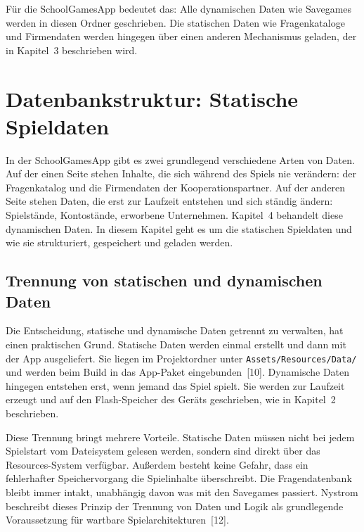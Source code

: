 \documentclass[12pt,a4paper]{article}
\begin{document}
Für die SchoolGamesApp bedeutet das: Alle dynamischen Daten wie Savegames werden in diesen Ordner geschrieben. Die statischen Daten wie Fragenkataloge und Firmendaten werden hingegen über einen anderen Mechanismus geladen, der in Kapitel~3 beschrieben wird.


\section{Datenbankstruktur: Statische Spieldaten}

In der SchoolGamesApp gibt es zwei grundlegend verschiedene Arten von Daten. Auf der einen Seite stehen Inhalte, die sich während des Spiels nie verändern: der Fragenkatalog und die Firmendaten der Kooperationspartner. Auf der anderen Seite stehen Daten, die erst zur Laufzeit entstehen und sich ständig ändern: Spielstände, Kontostände, erworbene Unternehmen. Kapitel~4 behandelt diese dynamischen Daten. In diesem Kapitel geht es um die statischen Spieldaten und wie sie strukturiert, gespeichert und geladen werden.

\subsection{Trennung von statischen und dynamischen Daten}

Die Entscheidung, statische und dynamische Daten getrennt zu verwalten, hat einen praktischen Grund. Statische Daten werden einmal erstellt und dann mit der App ausgeliefert. Sie liegen im Projektordner unter \texttt{Assets/\allowbreak{}Resources/\allowbreak{}Data/} und werden beim Build in das App-Paket eingebunden~[10]. Dynamische Daten hingegen entstehen erst, wenn jemand das Spiel spielt. Sie werden zur Laufzeit erzeugt und auf den Flash-Speicher des Geräts geschrieben, wie in Kapitel~2 beschrieben.

Diese Trennung bringt mehrere Vorteile. Statische Daten müssen nicht bei jedem Spielstart vom Dateisystem gelesen werden, sondern sind direkt über das Resources-System verfügbar. Außerdem besteht keine Gefahr, dass ein fehlerhafter Speichervorgang die Spielinhalte überschreibt. Die Fragendatenbank bleibt immer intakt, unabhängig davon was mit den Savegames passiert. Nystrom beschreibt dieses Prinzip der Trennung von Daten und Logik als grundlegende Voraussetzung für wartbare Spielarchitekturen~[12].
\end{document}
